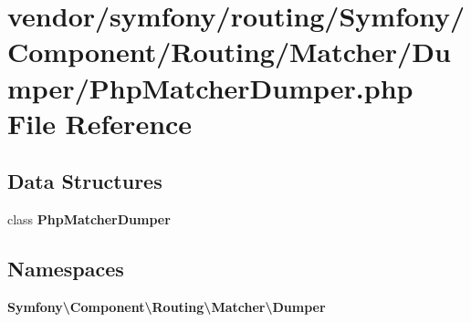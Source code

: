 \section{vendor/symfony/routing/\+Symfony/\+Component/\+Routing/\+Matcher/\+Dumper/\+Php\+Matcher\+Dumper.php File Reference}
\label{_php_matcher_dumper_8php}
\subsection*{Data Structures}
\begin{DoxyCompactItemize}
\item 
class {\bf Php\+Matcher\+Dumper}
\end{DoxyCompactItemize}
\subsection*{Namespaces}
\begin{DoxyCompactItemize}
\item 
 {\bf Symfony\textbackslash{}\+Component\textbackslash{}\+Routing\textbackslash{}\+Matcher\textbackslash{}\+Dumper}
\end{DoxyCompactItemize}
